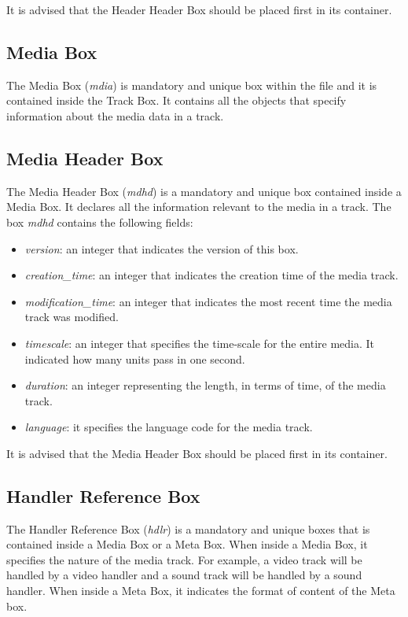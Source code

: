 It is advised that the Header Header Box should be placed first in its container.


\subsection*{Media Box}

The Media Box (\emph{mdia}) is mandatory and unique box within the file and it is contained inside the Track Box. It contains all the objects that specify information about the media data in a track.

\subsection*{Media Header Box}

The Media Header Box (\emph{mdhd}) is a mandatory and unique box contained inside a Media Box. It declares all the information relevant to the media in a track. The box \emph{mdhd} contains the following fields:

\begin{itemize}
\item \emph{version}: an integer that indicates the version of this box.
\item \emph{creation\_time}: an integer that indicates the creation time of the media track.
\item \emph{modification\_time}: an integer that indicates the most recent time the media track was modified.
\item \emph{timescale}: an integer that specifies the time-scale for the entire media. It indicated how many units pass in one second.
\item \emph{duration}: an integer representing the length, in terms of time, of the media track.
\item \emph{language}: it specifies the language code for the media track.
\end{itemize}

It is advised that the Media Header Box should be placed first in its container.

\subsection*{Handler Reference Box}

The Handler Reference Box (\emph{hdlr}) is a mandatory and unique boxes that is contained inside a Media Box or a Meta Box. When inside a Media Box, it specifies the nature of the media track. For example, a video track will be handled by a video handler and a sound track will be handled by a sound handler. When inside a Meta Box, it indicates the format of content of the Meta box.

